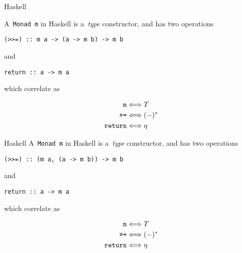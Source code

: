 \documentclass{beamer}
\begin{document}
\begin{frame}[fragile]{Haskell}

    A~\texttt{Monad m} in Haskell is a~\emph{type} constructor, and
    has two operations
    \begin{verbatim}
(>>=) :: m a -> (a -> m b) -> m b
    \end{verbatim}
    and
    \begin{verbatim}
return :: a -> m a
    \end{verbatim}


    \pause

    which correlate as

    \begin{align*}
        \text{\texttt{m}} &\Longleftrightarrow T \\
        \text{\texttt{>>=}} &\Longleftrightarrow (-)^{\ast} \\
        \text{\texttt{return}} &\Longleftrightarrow \eta
    \end{align*}

\end{frame}

\begin{frame}[fragile]{Haskell}
    A~\texttt{Monad m} in Haskell is a~\emph{type} constructor, and
    has two operations
    \begin{verbatim}
(>>=) :: (m a, (a -> m b)) -> m b
    \end{verbatim}
    and
    \begin{verbatim}
return :: a -> m a
    \end{verbatim}
    which correlate as

    \begin{align*}
        \text{\texttt{m}} &\Longleftrightarrow T \\
        \text{\texttt{>>=}} &\Longleftrightarrow (-)^{\ast} \\
        \text{\texttt{return}} &\Longleftrightarrow \eta
    \end{align*}
\end{frame}
\end{document}
